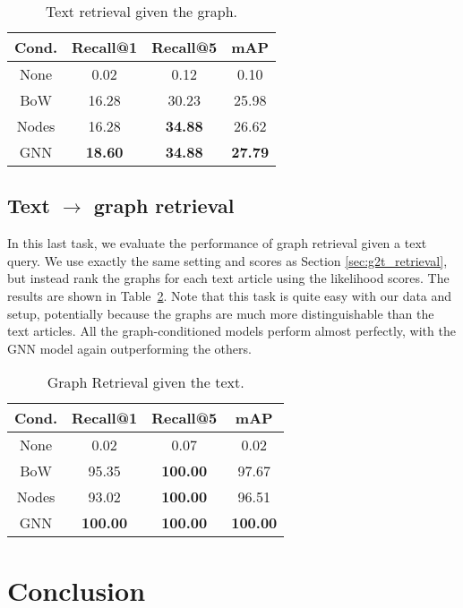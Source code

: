 \documentclass[11pt]{article}
\newcommand{\secref}[1]{Section \ref{#1}}
\begin{document}
\begin{table}[t]
    \centering
    \begin{tabular}{c|c|c|c}
    \hline
        Cond. & Recall@1 & Recall@5 & mAP \\
        \hline
        None & 0.02 & 0.12 & 0.10 \\
        BoW & 16.28 & 30.23 & 25.98 \\
        Nodes & 16.28 & \textbf{34.88} & 26.62 \\
        GNN & \textbf{18.60} & \textbf{34.88} & \textbf{27.79} \\
        \hline
    \end{tabular}
    \caption{Text retrieval given the graph.
}
    \label{tab:graph2text-retrieval}
\end{table}


\subsection{Text $\rightarrow$ graph retrieval}
In this last task, we evaluate the performance of graph retrieval given a text query.  We use exactly the same setting and scores as \secref{sec:g2t_retrieval}, but instead rank the graphs for each text article using the likelihood scores.
The results are shown in Table~\ref{tab:text2graph}. Note that this task is quite easy with our data and setup, potentially because the graphs are much more distinguishable than the text articles. All the graph-conditioned models perform almost perfectly, with the GNN model again outperforming the others.


\begin{table}[t]
    \centering
    \begin{tabular}{c|c|c|c}
    \hline
        Cond. & Recall@1 & Recall@5 & mAP \\
        \hline
        None & 0.02 & 0.07 & 0.02 \\
        BoW & 95.35 & \textbf{100.00} & 97.67 \\
        Nodes & 93.02 & \textbf{100.00} & 96.51 \\
        GNN & \textbf{100.00} & \textbf{100.00} & \textbf{100.00} \\
        \hline
    \end{tabular}
    \caption{Graph Retrieval given the text.}
    \label{tab:text2graph}
\end{table}

\section{Conclusion}
\end{document}
